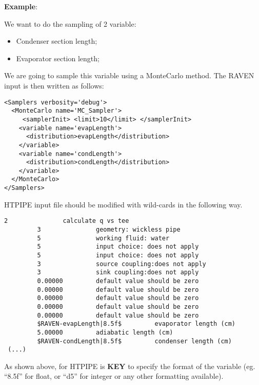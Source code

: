 \textbf{Example}:

We want to do the sampling of 2 variable:
\begin{itemize}
  \item Condenser section length;
  \item Evaporator section length;
\end{itemize}

\noindent We are going to sample this variable using a MonteCarlo method.
The RAVEN input is then written as follows:

\begin{lstlisting}[style=XML,morekeywords={name,type,construction,lowerBound,steps,limit,initialSeed}]
<Samplers verbosity='debug'>
  <MonteCarlo name='MC_Sampler'>
     <samplerInit> <limit>10</limit> </samplerInit>
    <variable name='evapLength'>
      <distribution>evapLength</distribution>
    </variable>
    <variable name='condLength'>
      <distribution>condLength</distribution>
    </variable>
  </MonteCarlo>
</Samplers>
\end{lstlisting}

HTPIPE input file should be modified with wild-cards in the following way.
\begin{lstlisting}[basicstyle=\tiny]
         2               calculate q vs tee
         3               geometry: wickless pipe    
         5               working fluid: water     
         5               input choice: does not apply      
         5               input choice: does not apply      
         3               source coupling:does not apply      
         3               sink coupling:does not apply      
         0.00000         default value should be zero                                     
         0.00000         default value should be zero                                     
         0.00000         default value should be zero                                     
         0.00000         default value should be zero                                     
         0.00000         default value should be zero                                     
         $RAVEN-evapLength|8.5f$         evaporator length (cm)
         5.00000         adiabatic length (cm)
         $RAVEN-condLength|8.5f$         condenser length (cm)                                            
 (...) 
\end{lstlisting}

As shown above, for HTPIPE is \textbf{KEY} to specify the format of the variable (eg. ``8.5f'' for float, or ``d5'' for integer or any other formatting available).\\

